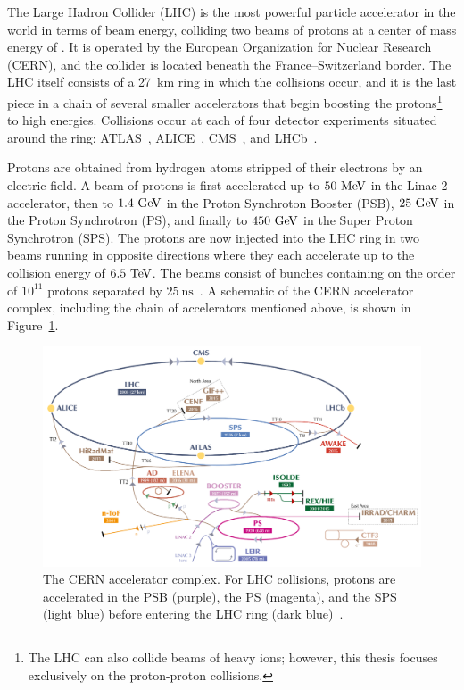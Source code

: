 ﻿The Large Hadron Collider (LHC) \cite{2008.LHC} is the most powerful particle accelerator in the world in terms of beam energy, colliding two beams of protons at a center of mass energy of .
It is operated by the European Organization for Nuclear Research (CERN), and the collider is located beneath the France--Switzerland border.
The LHC itself consists of a 27~km ring in which the collisions occur, and it is the last piece in a chain of several smaller accelerators that begin boosting the protons\footnote{The LHC can also collide beams of heavy ions; however, this thesis focuses exclusively on the proton-proton collisions.} to high energies.
Collisions occur at each of four detector experiments situated around the ring: ATLAS~\cite{2008.ATLAS.detector-paper}, ALICE~\cite{2008.alice}, CMS~\cite{2008.cms}, and LHCb~\cite{2008.lhcb}.

Protons are obtained from hydrogen atoms stripped of their electrons by an electric field.
A beam of protons is first accelerated up to $50\mev$ in the Linac 2 accelerator, then to $1.4\gev$ in the Proton Synchroton Booster (PSB), $25\gev$ in the Proton Synchrotron (PS), and finally to $450\gev$ in the Super Proton Synchrotron (SPS).
The protons are now injected into the LHC ring in two beams running in opposite directions where they each accelerate up to the collision energy of $6.5\tev$.
The beams consist of bunches containing on the order of $10^{11}$ protons separated by $25~\textrm{ns}$~\cite{2019.accelerator-complex}.
A schematic of the CERN accelerator complex, including the chain of accelerators mentioned above, is shown in Figure~\ref{fig:detector_accelerator_complex}.

\begin{figure}
  \centering
  \includegraphics[width=.9\textwidth]{figs/detector/accelerator-complex-small}
  \caption[The CERN accelerator complex.  For LHC collisions, protons are accelerated in the PSB (purple), the PS (magenta), and the SPS (light blue) before entering the LHC ring (dark blue).]{The CERN accelerator complex.  For LHC collisions, protons are accelerated in the PSB (purple), the PS (magenta), and the SPS (light blue) before entering the LHC ring (dark blue)~\cite{2016.accelerator-image}.}
  \label{fig:detector_accelerator_complex}
\end{figure}

